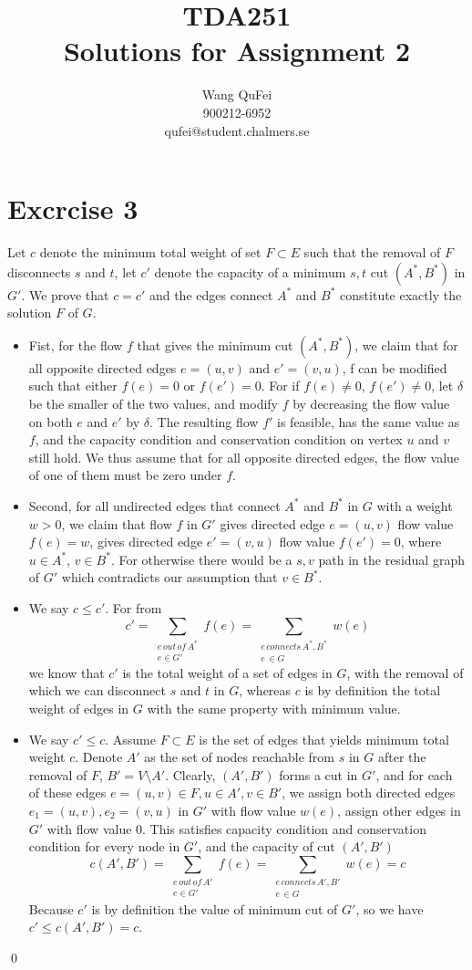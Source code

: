 \documentclass[10pt]{article}
\title{TDA251\\Solutions for Assignment 2}
\author{Wang QuFei\\900212-6952\\qufei@student.chalmers.se}
\begin{document}
\maketitle
\section*{Excrcise 3}
Let $c$ denote the minimum total weight of set $F \subset E$ such that the removal of $F$ disconnects $s$ and $t$, let $c'$ denote the capacity of a minimum $s,t$ cut $(A^{*},B^{*})$ in $G'$. We prove that $c = c'$ and the edges connect $A^*$ and $B^*$ constitute exactly the solution $F$ of $G$.
\begin{itemize}
	\item Fist, for the flow $f$ that gives the minimum cut $(A^{*},B^{*})$, we claim that for all opposite directed edges $e=(u,v)$ and $e'=(v,u)$, f can be modified such that either $f(e)=0$ or $f(e')=0$. For if $f(e) \neq 0$, $f(e') \neq 0$, let $\delta$ be the smaller of the two values, and modify $f$ by decreasing the flow value on both $e$ and $e'$ by $\delta$. The resulting flow $f'$ is feasible, has the same value as $f$, and the capacity condition and conservation condition on vertex $u$ and $v$ still hold. We thus assume that for all opposite directed edges, the flow value of one of them must be zero under $f$.
	\item Second, for all undirected edges that connect $A^*$ and $B^*$ in $G$ with a weight $w > 0$, we claim that flow $f$ in $G'$ gives directed edge $e=(u,v)$ flow value $f(e)=w$, gives directed edge $e'=(v,u)$ flow value $f(e')=0$, where $u \in A^*$, $v \in B^*$. For otherwise there would be a $s,v$ path in the residual graph of $G'$ which contradicts our assumption that $v \in B^*$.
	\item We say $c \leq c'$. For from
		\[c' = \sum_{\substack{e\, out\, of\, A^*\\ e \in G'}}f(e) = \sum_{\substack{e\, connects\, A^*,B^*\\ e\, \in G}}w(e)\]
we know that $c'$ is the total weight of a set of edges in $G$, with the removal of which we can disconnect $s$ and $t$ in $G$, whereas $c$ is by definition the total weight of edges in $G$ with the same property with minimum value.
	\item We say $c' \leq c$. Assume $F \subset E$ is the set of edges that yields minimum total weight $c$. Denote $A'$ as the set of nodes reachable from $s$ in $G$ after the removal of $F$, $B' = V \setminus A'$. Clearly, $(A',B')$ forms a cut in $G'$, and for each of these edges $e=(u,v) \in F, u \in A', v \in B'$, we assign both directed edges $e_1=(u,v), e_2=(v,u)$ in $G'$ with flow value $w(e)$, assign other edges in $G'$ with flow value 0. This satisfies capacity condition and conservation condition for every node in $G'$, and the capacity of cut $(A',B')$
		\[c(A',B') = \sum_{\substack{e\, out\, of\, A'\\ e \in G'}}f(e) = \sum_{\substack{e\, connects\, A',B'\\ e\, \in G}}w(e) = c\]
Because $c'$ is by definition the value of minimum cut of $G'$, so we have $c' \leq c(A',B') = c$.
\end{itemize}
\qed
\end{document}
